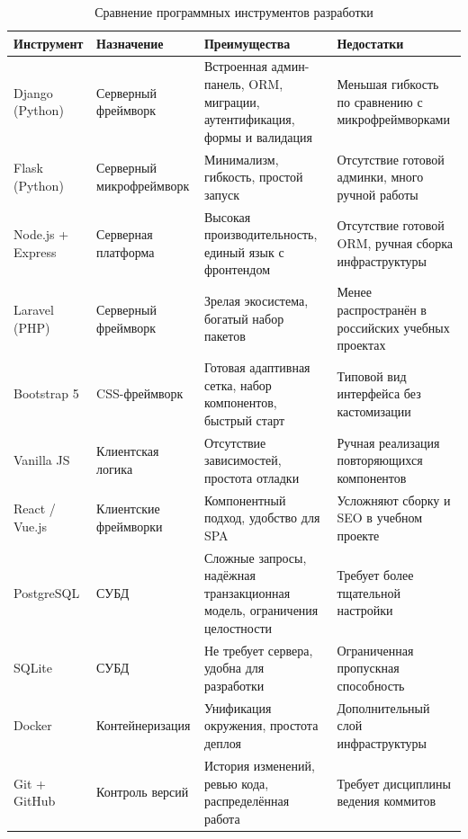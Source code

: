\begin{table}[ht!]
\caption{Сравнение программных инструментов разработки}
\label{tab:tech}
\small
\begin{tabularx}{\textwidth}{|>{\RaggedRight\arraybackslash}p{}|>{\RaggedRight\arraybackslash}p{}|>{\RaggedRight\arraybackslash}X|>{\RaggedRight\arraybackslash}X|}
\hline
\textbf{Инструмент} & \textbf{Назначение} & \textbf{Преимущества} & \textbf{Недостатки} \\ \hline
Django (Python) & Серверный фреймворк & Встроенная админ-панель, ORM, миграции, аутентификация, формы и валидация & Меньшая гибкость по сравнению с микрофреймворками \\ \hline
Flask (Python) & Серверный микрофреймворк & Минимализм, гибкость, простой запуск & Отсутствие готовой админки, много ручной работы \\ \hline
Node.js + Express & Серверная платформа & Высокая производительность, единый язык с фронтендом & Отсутствие готовой ORM, ручная сборка инфраструктуры \\ \hline
Laravel (PHP) & Серверный фреймворк & Зрелая экосистема, богатый набор пакетов & Менее распространён в российских учебных проектах \\ \hline
Bootstrap 5 & CSS-фреймворк & Готовая адаптивная сетка, набор компонентов, быстрый старт & Типовой вид интерфейса без кастомизации \\ \hline
Vanilla JS & Клиентская логика & Отсутствие зависимостей, простота отладки & Ручная реализация повторяющихся компонентов \\ \hline
React / Vue.js & Клиентские фреймворки & Компонентный подход, удобство для SPA & Усложняют сборку и SEO в учебном проекте \\ \hline
PostgreSQL & СУБД & Сложные запросы, надёжная транзакционная модель, ограничения целостности & Требует более тщательной настройки \\ \hline
SQLite & СУБД & Не требует сервера, удобна для разработки & Ограниченная пропускная способность \\ \hline
Docker & Контейнеризация & Унификация окружения, простота деплоя & Дополнительный слой инфраструктуры \\ \hline
Git + GitHub & Контроль версий & История изменений, ревью кода, распределённая работа & Требует дисциплины ведения коммитов \\ \hline
\end{tabularx}
\end{table}

